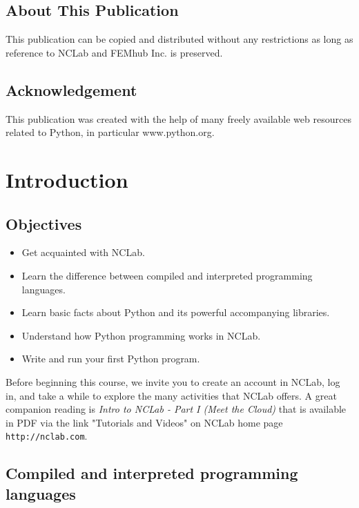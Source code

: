 \documentclass[article,A4,12pt]{llncs}
\begin{document}
\subsection*{About This Publication}
This publication can be copied and distributed without any restrictions
as long as reference to NCLab and FEMhub Inc. is preserved.

\subsection*{Acknowledgement}
This publication was created with the help of many freely 
available web resources related to Python, in
particular www.python.org.

\normalsize

\newpage
\setcounter{tocdepth}{2}
\tableofcontents

\newpage

\pagestyle{plain}
\setcounter{page}{1}


\section{Introduction}

\subsection{Objectives}

\begin{itemize}
\item Get acquainted with NCLab.
\item Learn the difference between compiled and interpreted programming languages.
\item Learn basic facts about Python and its powerful accompanying libraries.
\item Understand how Python programming works in NCLab.
\item Write and run your first Python program.
\end{itemize}
Before beginning this course, we invite you to create an account in 
NCLab, log in, and take a while to explore the many activities 
that NCLab offers. A great companion reading is {\em Intro to NCLab - Part I 
(Meet the Cloud)} that is available in PDF via the link "Tutorials and Videos"
on NCLab home page {\tt http://nclab.com}.

\subsection{Compiled and interpreted programming languages}
\end{document}
